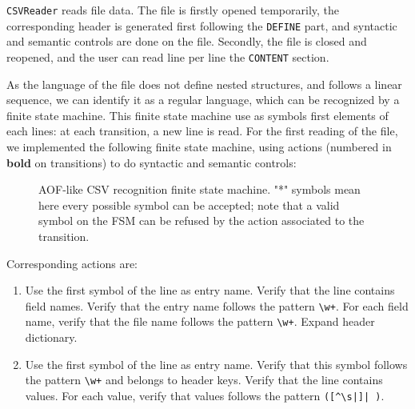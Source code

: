 \documentclass[a4paper, 11pt]{report}
\begin{document}
    \texttt{CSVReader} reads file data. The file is firstly opened temporarily, the corresponding header is generated first following the \texttt{DEFINE} part, and syntactic and semantic controls are done on the file. Secondly, the file is closed and reopened, and the user can read line per line the \texttt{CONTENT} section. \newline
    
    As the language of the file does not define nested structures, and follows a linear sequence, we can identify it as a regular language, which can be recognized by a finite state machine. This finite state machine use as symbols first elements of each lines: at each transition, a new line is read. For the first reading of the file, we implemented the following finite state machine, using actions (numbered in \textbf{bold} on transitions) to do syntactic and semantic controls:
    
    \begin{figure}[H]
        \centering
        \caption{AOF-like CSV recognition finite state machine. "*" symbols mean here every possible symbol can be accepted; note that a valid symbol on the FSM can be refused by the action associated to the transition.}
        \label{AOF-like CSV recognition finite state machine}
    \end{figure}
    
    Corresponding actions are:
    
    \begin{enumerate}[label=\textbf{(\arabic*)}: ]
        \item Use the first symbol of the line as entry name. Verify that the line contains field names. Verify that the entry name follows the pattern \texttt{\textbackslash w+}. For each field name, verify that the file name follows the pattern \texttt{\textbackslash w+}. Expand header dictionary.
        \item Use the first symbol of the line as entry name. Verify that this symbol follows the pattern \texttt{\textbackslash w+} and belongs to header keys. Verify that the line contains values. For each value, verify that values follows the pattern \verb*!([^\s|]| )!.
    \end{enumerate}
    
\end{document}

